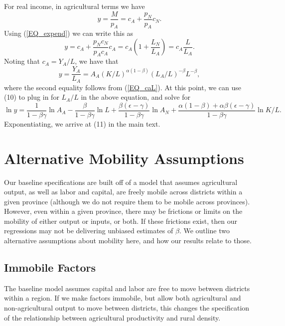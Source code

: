 \documentclass[11pt]{article}
\begin{document}
For real income, in agricultural terms we have
\begin{equation}
    y = \frac{M}{p_A} = c_A + \frac{p_N}{p_A} c_N. \nonumber
\end{equation}
Using (\ref{EQ_expend}) we can write this as
\begin{equation}
    y = c_A + \frac{p_N c_N}{p_A c_A}c_A = c_A \left(1 + \frac{L_N}{L_A}\right) = c_A \frac{L}{L_A}. \nonumber
\end{equation}
Noting that $c_A = Y_A/L$, we have that
\begin{equation}
    y = \frac{Y_A}{L_A} = A_A (K/L)^{\alpha(1-\beta)} (L_A/L)^{-\beta} L^{-\beta}, \nonumber
\end{equation}
where the second equality follows from (\ref{EQ_caL}). At this point, we can use (10) to plug in for $L_A/L$ in the above equation, and solve for 
\begin{equation}
    \ln y = \frac{1}{1-\beta\gamma} \ln A_A - \frac{\beta}{1-\beta\gamma} \ln L + \frac{\beta(\epsilon-\gamma)}{1-\beta\gamma} \ln A_N + \frac{\alpha(1-\beta) + \alpha\beta(\epsilon-\gamma)}{1-\beta\gamma} \ln K/L. \nonumber
\end{equation}
Exponentiating, we arrive at (11) in the main text.

\section{Alternative Mobility Assumptions}
Our baseline specifications are built off of a model that assumes agricultural output, as well as labor and capital, are freely mobile across districts within a given province (although we do not require them to be mobile across provinces). However, even within a given province, there may be frictions or limits on the mobility of either output or inputs, or both. If these frictions exist, then our regressions may not be delivering unbiased estimates of $\beta$. We outline two alternative assumptions about mobility here, and how our results relate to those. 

\subsection{Immobile Factors}
The baseline model assumes capital and labor are free to move between districts within a region. If we make factors immobile, but allow both agricultural and non-agricultural output to move between districts, this changes the specification of the relationship between agricultural productivity and rural density. 
\end{document}
